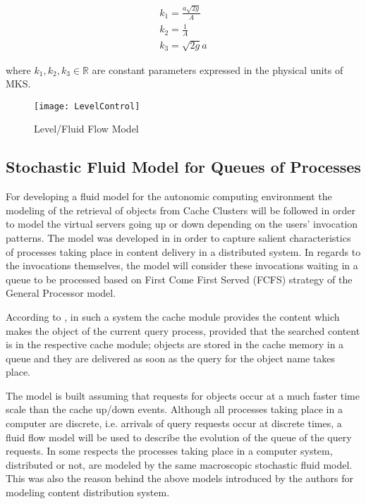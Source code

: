 \begin{equation}
\begin{array}{l}
k_{1}= \frac{a \sqrt {2g}}{A} \\
k_{2} = \frac{1}{A} \\ 
k_{3} = \sqrt{2g}a
\end{array}
\end{equation}
 
where $k_{1}, k_{2}, k_{3} \in \mathbb{R}$ are constant parameters expressed in the physical units of MKS.

\begin{figure}[htb!]
\texttt{[image: LevelControl]}
\caption{Level/Fluid Flow Model}
\label{fig:LevelControl}
\end{figure}

\subsection{Stochastic Fluid Model for Queues of Processes}

For developing a fluid model for the autonomic computing environment the modeling of the retrieval of objects from Cache Clusters will be followed in order to model the virtual servers going up or down depending on the users' invocation patterns.  The model was developed in \cite{clevnot:fluidmodel} in order to capture  salient characteristics of processes taking place in content delivery in a distributed system. In regards to the invocations themselves, the model will consider these invocations waiting in a queue to be processed based on First Come First Served (FCFS) strategy of the General Processor model.

According to \cite{clevnot:fluidmodel}, in such a system the cache module provides the content which makes the object of the current query process, provided that the searched content is in the respective cache module; objects are stored in the cache memory in a queue and they are delivered as soon as the query for the object name takes place. 

The model is built assuming that requests for objects occur at a much faster time scale than the cache up/down events. Although all processes taking place in a computer are discrete, i.e. arrivals of query requests occur at discrete times, a fluid flow model will be used to describe the evolution of the queue of the query requests. In some respects the processes taking place in a computer system, distributed or not, are modeled by the same macroscopic stochastic fluid model. This was also the reason behind the above models introduced by the authors for modeling content distribution system.

